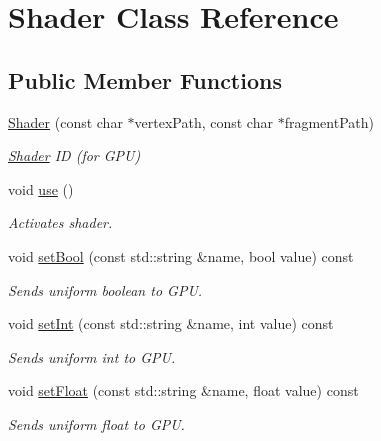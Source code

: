 \hypertarget{class_shader}{\section{Shader Class Reference}
\label{class_shader}
}
\subsection*{Public Member Functions}
\begin{DoxyCompactItemize}
\item 
\hyperlink{class_shader_a3e135bbf914b087a939114d79c10d283}{Shader} (const char $\ast$vertex\+Path, const char $\ast$fragment\+Path)
\begin{DoxyCompactList}\small\item\em \hyperlink{class_shader}{Shader} I\+D (for G\+P\+U) \end{DoxyCompactList}\item 
\hypertarget{class_shader_a870fa9f13d69e558815d6fd351a469dc}{void \hyperlink{class_shader_a870fa9f13d69e558815d6fd351a469dc}{use} ()}\label{class_shader_a870fa9f13d69e558815d6fd351a469dc}

\begin{DoxyCompactList}\small\item\em Activates shader. \end{DoxyCompactList}\item 
\hypertarget{class_shader_a23700270a4fb0aaa2c2404c54e27cced}{void \hyperlink{class_shader_a23700270a4fb0aaa2c2404c54e27cced}{set\+Bool} (const std\+::string \&name, bool value) const }\label{class_shader_a23700270a4fb0aaa2c2404c54e27cced}

\begin{DoxyCompactList}\small\item\em Sends uniform boolean to G\+P\+U. \end{DoxyCompactList}\item 
\hypertarget{class_shader_a060af09412f03f9576f1d7e2cbe76a92}{void \hyperlink{class_shader_a060af09412f03f9576f1d7e2cbe76a92}{set\+Int} (const std\+::string \&name, int value) const }\label{class_shader_a060af09412f03f9576f1d7e2cbe76a92}

\begin{DoxyCompactList}\small\item\em Sends uniform int to G\+P\+U. \end{DoxyCompactList}\item 
\hypertarget{class_shader_a066880ecc3bdb350ec7491c892162dd0}{void \hyperlink{class_shader_a066880ecc3bdb350ec7491c892162dd0}{set\+Float} (const std\+::string \&name, float value) const }\label{class_shader_a066880ecc3bdb350ec7491c892162dd0}

\begin{DoxyCompactList}\small\item\em Sends uniform float to G\+P\+U. \end{DoxyCompactList}\end{DoxyCompactItemize}
